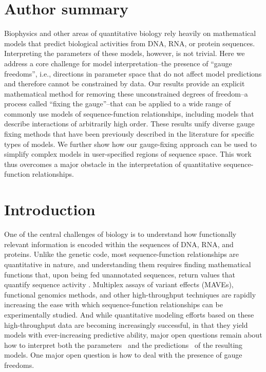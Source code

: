 \documentclass[10pt,letterpaper]{article}
\begin{document}
\section*{Author summary}

Biophysics and other areas of quantitative biology rely heavily on mathematical models that predict biological activities from DNA, RNA, or protein sequences. Interpreting the parameters of these models, however, is not trivial. Here we address a core challenge for model interpretation--the presence of ``gauge freedoms'', i.e., directions in parameter space that do not affect model predictions and therefore cannot be constrained by data. Our results provide an explicit mathematical method for removing these unconstrained degrees of freedom--a process called ``fixing the gauge''--that can be applied to a wide range of commonly use models of sequence-function relationships, including models that describe interactions of arbitrarily high order. These results unify diverse gauge fixing methods that have been previously described in the literature for specific types of models. We further show how our gauge-fixing approach can be used to simplify complex models in user-specified regions of sequence space. This work thus overcomes a major obstacle in the interpretation of quantitative sequence-function relationships.


\section*{Introduction}

One of the central challenges of biology is to understand how functionally relevant information is encoded within the sequences of DNA, RNA, and proteins. Unlike the genetic code, most sequence-function relationships are quantitative in nature, and understanding them requires finding mathematical functions that, upon being fed unannotated sequences, return values that quantify sequence activity \cite{Kinney:2019jc}. Multiplex assays of variant effects (MAVEs), functional genomics methods, and other high-throughput techniques are rapidly increasing the ease with which sequence-function relationships can be experimentally studied. And while quantitative modeling efforts based on these high-throughput data are becoming increasingly successful, in that they yield models with ever-increasing predictive ability, major open questions remain about how to interpret both the parameters~\cite{weinberger1991fourier, stadler1996landscapes, weinreich2013should, poelwijk2016context, ferretti2016measuring, bank2016predictability, poelwijk2019learning, Tareen:2022dh, Brookes:2022aa, faure2023extension, Metzger:2024aa} and the predictions~\cite{novakovsky2023obtaining, koo2021global, Park:2023aa, seitz2023interpreting, Dupic2024:aa} of the resulting models. One major open question is how to deal with the presence of gauge freedoms. 
\end{document}
